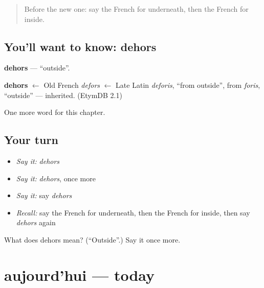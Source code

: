 \label{lesson:FR-C97-dehors}



\begin{quote}
Before the new one: say the French for underneath, then the French for inside.
\end{quote}

\subsection*{You'll want to know: dehors}
\textbf{dehors} — \textquotedblleft{}outside\textquotedblright{}.

\begin{cousinweb}
\textbf{dehors} $\leftarrow$ Old French \emph{defors} $\leftarrow$ Late Latin \emph{deforis}, \textquotedblleft{}from outside\textquotedblright{}, from \emph{foris}, \textquotedblleft{}outside\textquotedblright{} — inherited. (EtymDB 2.1)
\end{cousinweb}

\begin{grammarlens}[title={What you've built}]
One more word for this chapter.
\end{grammarlens}

\subsection*{Your turn}
\begin{itemize}
\raggedright
  \item \emph{Say it:} \emph{dehors}
  \item \emph{Say it:} \emph{dehors}, once more
  \item \emph{Say it:} say \emph{dehors}
  \item \emph{Recall:} say the French for underneath, then the French for inside, then say \emph{dehors} again
\end{itemize}

\begin{tcolorbox}[breakable,colback=teal!4,colframe=teal!35!black,title={Before you move on}]
What does dehors mean? (\textquotedblleft{}Outside\textquotedblright{}.) Say it once more.
\end{tcolorbox}
\section[aujourd'hui]{aujourd'hui — today}

\label{lesson:FR-C97-hui}



